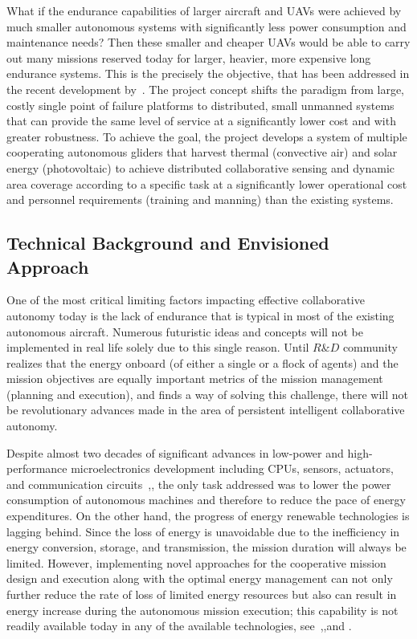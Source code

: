 \documentclass{ifacconf}
\begin{document}
What if the endurance capabilities of larger aircraft and UAVs were achieved by much smaller autonomous systems with significantly less power consumption and maintenance needs? Then these smaller and cheaper UAVs would be able to carry out many missions reserved today for larger, heavier, more expensive long endurance systems. This is the precisely the objective, that has been addressed in the recent development by~\cite{AKlass_JGCD:2012,AKlass_CDC:2012}. The project concept shifts the paradigm from large, costly single point of failure platforms to distributed, small unmanned systems that can provide the same level of service at a significantly lower cost and with greater robustness. To achieve the goal, the project develops a system of multiple cooperating autonomous gliders that harvest thermal (convective air) and solar energy (photovoltaic) to achieve distributed collaborative sensing and dynamic area coverage according to a specific task at a significantly lower operational cost and personnel requirements (training and manning) than the existing systems.


\subsection{Technical Background and Envisioned Approach}

One of the most critical limiting factors impacting effective collaborative autonomy today is the lack of endurance that is typical in most of the existing autonomous aircraft. Numerous futuristic ideas and concepts will not be implemented in real life solely due to this single reason. Until $R\&D$ community realizes that the energy onboard (of either a single or a flock of agents) and the mission objectives are equally important metrics of the mission management (planning and execution), and finds a way of solving this challenge, there will not be revolutionary advances made in the area of persistent intelligent collaborative autonomy.

Despite almost two decades of significant advances in low-power and high-performance microelectronics development including CPUs, sensors, actuators, and communication circuits~\cite{Tong:1995},\cite{Singh:2010}, the only task addressed was to lower the power consumption of autonomous machines and therefore to reduce the pace of energy expenditures. On the other hand, the progress of energy renewable technologies is lagging behind. Since the loss of energy is unavoidable due to the inefficiency in energy conversion, storage, and transmission, the mission duration will always be limited. However, implementing novel approaches for the cooperative mission design and execution along with the optimal energy management can not only further reduce the rate of loss of limited energy resources but also can result in energy increase during the autonomous mission execution; this capability is not readily available today in any of the available technologies, see~\cite{Siciliano:2008},\cite{Martinez:2008},and \cite{Nonami:2013}.
\end{document}
